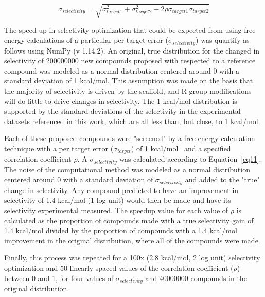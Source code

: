 \documentclass[phd,tocprelim]{cornell}
\begin{document}
\begin{equation}\label{eq11}
\sigma_{selectivity} = \sqrt{\sigma_{target1}^2 + \sigma_{target2}^2 - 2\rho\sigma_{target1}\sigma_{target2}}
\end{equation}

The speed up in selectivity optimization that could be expected from using free energy calculations of a particular per target error ($\sigma_{selectivity}$) was quantify as follows using NumPy (v 1.14.2). An original, true distribution for the changed in selectivity of 200000000 new compounds proposed with respected to a reference compound was modeled as a normal distribution centered around 0 with a standard deviation of 1 kcal/mol. This assumption was made on the basis that the majority of selectivity is driven by the scaffold, and R group modifications will do little to drive changes in selectivity. The 1 kcal/mol distribution is supported by the standard deviations of the selectivity in the experimental datasets referenced in this work, which are all less than, but close, to 1 kcal/mol. 

Each of these proposed compounds were "screened" by a free energy calculation technique with a per target error ($\sigma_{target}$) of 1 kcal/mol~\citep{Wang:J.Am.Chem.Soc.:2015} and a specified correlation coefficient $\rho$. A $\sigma_{selectivity}$ was calculated according to Equation~\ref{eq11}. The noise of the computational method was modeled as a normal distribution centered around 0 with a standard deviation of $\sigma_{selectivity}$ and added to the "true" change in selectivity. Any compound predicted to have an improvement in selectivity of 1.4 kcal/mol (1 log unit) would then be made and have its selectivity experimental measured. The speedup value for each value of $\rho$ is calculated as the proportion of compounds made with a true selectivity gain of 1.4 kcal/mol divided by the proportion of compounds with a 1.4 kcal/mol improvement in the original distribution, where all of the compounds were made. 

Finally, this process was repeated for a 100x (2.8 kcal/mol, 2 log unit) selectivity optimization and 50 linearly spaced values of the correlation coefficient ($\rho$) between 0 and 1, for four values of $\sigma_{selectivity}$ and 40000000 compounds in the original distribution. 
\end{document}
